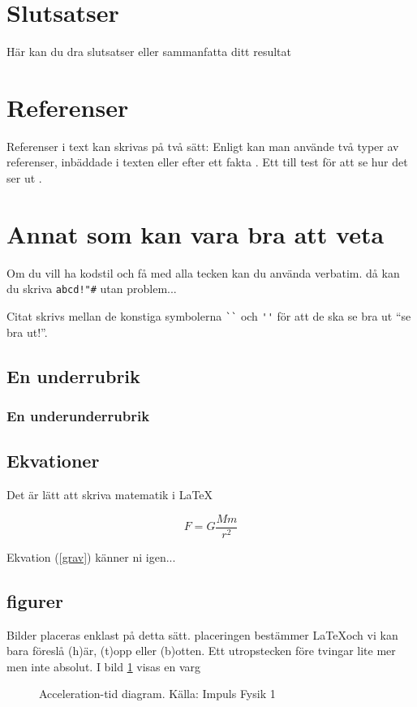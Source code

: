 \documentclass[11p]{article}
\begin{document}
    \section{Slutsatser}
    Här kan du dra slutsatser eller sammanfatta ditt resultat


    \section{Referenser}
    Referenser i text kan skrivas på två sätt: Enligt \textcite{Jens} kan man använde två typer av referenser, inbäddade i texten eller efter ett fakta \parencite{Fraenkel}. Ett till test för att se hur det ser ut \parencite[sid 55]{fermi}.

    \section{Annat som kan vara bra att veta}
    Om du vill ha kodstil och få med alla tecken kan du använda verbatim. då kan du skriva \verb|abcd!"#| utan problem...

    Citat skrivs mellan de konstiga symbolerna \verb|``| och \verb|''| för att de ska se bra ut ``se bra ut!''.
    \subsection{En underrubrik}
    \subsubsection{En underunderrubrik}
    \subsection{Ekvationer}
    Det är lätt att skriva matematik i \LaTeX

    \begin{equation}
        F = G \frac{M m}{r^2}
        \label{grav}
    \end{equation}

    Ekvation (\ref{grav}) känner ni igen...

    \subsection{figurer}
    Bilder placeras enklast på detta sätt. placeringen bestämmer \LaTeX och vi kan bara föreslå (h)är, (t)opp eller (b)otten. Ett utropstecken före tvingar lite mer men inte absolut. I bild \ref{varg} visas en varg
    \begin{figure}[!h]

        \caption{Acceleration-tid diagram. Källa: Impuls Fysik 1}
        \label{varg}
    \end{figure}
    \printbibliography
\end{document}
